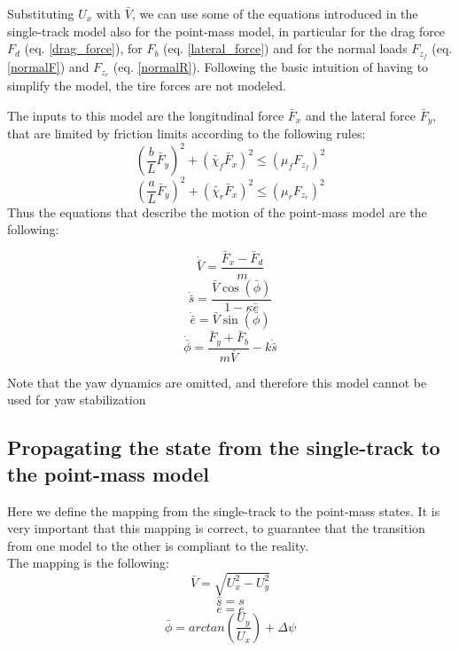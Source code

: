 \documentclass[a4paper, onecolumn, 11pt, twoside]{article}
\begin{document}
Substituting ${U}_x$ with $\bar{V}$, we can use some of the equations introduced in the single-track model also for the point-mass model,
in particular for the drag force ${F}_d$ (eq. \ref{drag_force}), for ${F}_b$ (eq. \ref{lateral_force}) and for the normal loads ${F}_{z_f}$ (eq. \ref{normalF}) and ${F}_{z_r}$ (eq. \ref{normalR}).
Following the basic intuition of having to simplify the model, the tire forces are not modeled.

The inputs to this model are the longitudinal force $\bar{F}_x$ and the lateral force $\bar{F}_y$, that are limited by friction limits
according to the following rules:
\begin{equation}
    \left(\frac{b}{L}\bar{F}_y\right)^2 + \left(\tilde{\chi_f}\bar{F}_x\right)^2 \leq \left(\mu_f F_{z_f}\right)^2
\end{equation}
\begin{equation}
    \left(\frac{a}{L}\bar{F}_y\right)^2 + \left(\tilde{\chi_r}\bar{F}_x\right)^2 \leq \left(\mu_r F_{z_r}\right)^2
\end{equation}
Thus the equations that describe the motion of the point-mass model are the following:

\begin{equation}
    \dot{\bar{V}} = \frac{\bar{F}_{x}-\bar{F}_{d}}{m}
\end{equation}
\begin{equation}
    \dot{\bar{s}} = \frac{\bar{V}\cos(\bar{\phi})}{1-\kappa \bar{e}}
\end{equation}
\begin{equation}
    \dot{\bar{e}} = \bar{V}\sin(\bar{\phi})
\end{equation}
\begin{equation}
    \dot{\bar{\phi}} = \frac{{\bar{F}}_y + {\bar{F}}_b}{m\bar{V}} - k\dot{\bar{s}}
\end{equation}

Note that the yaw dynamics are omitted, and therefore this model cannot be used for yaw stabilization

\subsection{Propagating the state from the single-track to the point-mass model}
Here we define the mapping from the single-track to the point-mass states. 
It is very important that this mapping is correct, to guarantee that the transition
from one model to the other is compliant to the reality.\\
The mapping is the following:
\begin{equation}
    \bar{V} = \sqrt{U_{x}^{2}-U_{y}^{2}}
\end{equation}
\begin{equation}
    \bar{s} = s
\end{equation}
\begin{equation}
    \bar{e} = e
\end{equation}
\begin{equation}
    \bar{\phi} = arctan\left(\frac{{U}_y}{{U}_x}\right) + \Delta\psi
\end{equation}
\end{document}
